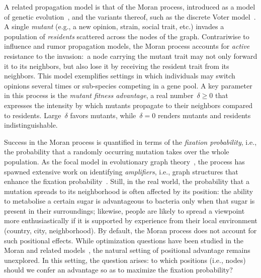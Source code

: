 \documentclass[letterpaper]{article}
\newcommand{\FitAdv}{\delta}
\begin{document}
A related propagation model is that of the Moran process, introduced as a model of genetic evolution~\cite{Moran1958}, and the variants thereof, such as the discrete Voter model~\cite{Clifford1973,Liggett1985, Antal2006, Talamali2021}.
A single \emph{mutant} (e.g., a new opinion, strain, social trait, etc.) invades a population of \emph{residents} scattered across the nodes of the graph.
Contrariwise to influence and rumor propagation models, the Moran process accounts for \emph{active} resistance to the invasion:~a node carrying the mutant trait may not only forward it to its neighbors, but also lose it by receiving the resident trait from its neighbors.
This model exemplifies settings in which individuals may switch opinions several times or sub-species competing in a gene pool.
A key parameter in this process is the \emph{mutant fitness advantage}, a real number~$\FitAdv\geq 0$ that expresses the intensity by which mutants propagate to their neighbors compared to residents. Large~$\FitAdv$ favors mutants, while~$\FitAdv=0$ renders mutants and residents indistinguishable.

Success in the Moran process is quantified in terms of the \emph{fixation probability}, i.e., the probability that a randomly occurring mutation takes over the whole population.
As the focal model in evolutionary graph theory~\cite{Lieberman2005}, the process has spawned extensive work on identifying \emph{amplifiers}, i.e., graph structures that enhance the fixation probability~\cite{Monk2014,Giakkoupis16,Galanis2017,Pavlogiannis2018,Tkadlec2021}.
Still, in the real world, the probability that a mutation spreads to its neighborhood is often affected by its position:
the ability to metabolise a certain sugar is advantageous to bacteria only when that sugar is present in their surroundings;
likewise, people are likely to spread a viewpoint more enthusiastically
if it is supported by experience from their local environment (country, city, neighborhood).
By default, the Moran process does not account for such positional effects.
While optimization questions have been studied in the Moran and related models~\cite{EvenDar2007}, the natural setting of positional advantage remains unexplored.
In this setting, the question arises: to which positions (i.e., nodes) should we confer an advantage so as to maximize the fixation probability?
\end{document}
